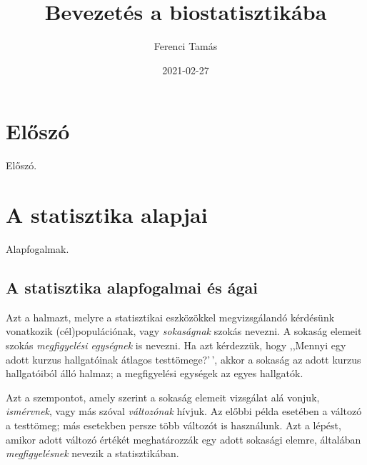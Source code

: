 \documentclass[
]{book}
\title{Bevezetés a biostatisztikába}
\author{Ferenci Tamás}
\date{2021-02-27}
\begin{document}
\maketitle

{
\setcounter{tocdepth}{1}
\tableofcontents
}
\hypertarget{elux151szuxf3}{%
\chapter{Előszó}\label{elux151szuxf3}}

Előszó.

\hypertarget{a-statisztika-alapjai}{%
\chapter{A statisztika alapjai}\label{a-statisztika-alapjai}}

Alapfogalmak.

\hypertarget{a-statisztika-alapfogalmai-uxe9s-uxe1gai}{%
\section{A statisztika alapfogalmai és ágai}\label{a-statisztika-alapfogalmai-uxe9s-uxe1gai}}

Azt a halmazt, melyre a statisztikai eszközökkel megvizsgálandó kérdésünk vonatkozik (cél)populációnak, vagy \emph{sokaságnak} szokás nevezni. A sokaság elemeit szokás \emph{megfigyelési egységnek} is nevezni. Ha azt kérdezzük, hogy ,,Mennyi egy adott kurzus hallgatóinak átlagos testtömege?'\,', akkor a sokaság az adott kurzus hallgatóiból álló halmaz; a megfigyelési egységek az egyes hallgatók.

Azt a szempontot, amely szerint a sokaság elemeit vizsgálat alá vonjuk, \emph{ismérvnek}, vagy más szóval \emph{változónak} hívjuk. Az előbbi példa esetében a változó a testtömeg; más esetekben persze több változót is használunk. Azt a lépést, amikor adott változó értékét meghatározzák egy adott sokasági elemre, általában \emph{megfigyelésnek} nevezik a statisztikában.
\end{document}
